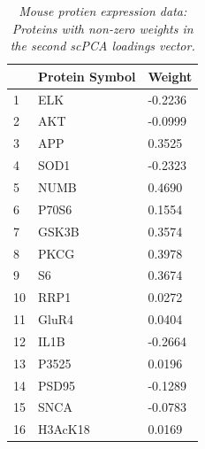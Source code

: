 \documentclass{article}
\begin{document}
\newpage
\begin{longtable}{| l | p{4cm} | l |}
  \caption{{\em Mouse protien expression data: Proteins with non-zero weights in the second scPCA loadings vector.}}
  \label{tab:mouse_prot_2} \\
  \hline
 & Protein Symbol & Weight \\ 
 \hline
  1 & ELK & -0.2236 \\ 
  2 & AKT & -0.0999 \\ 
  3 & APP & 0.3525 \\ 
  4 & SOD1 & -0.2323 \\ 
  5 & NUMB & 0.4690 \\ 
  6 & P70S6 & 0.1554 \\ 
  7 & GSK3B & 0.3574 \\ 
  8 & PKCG & 0.3978 \\ 
  9 & S6 & 0.3674 \\ 
  10 & RRP1 & 0.0272 \\ 
  11 & GluR4 & 0.0404 \\ 
  12 & IL1B & -0.2664 \\ 
  13 & P3525 & 0.0196 \\ 
  14 & PSD95 & -0.1289 \\ 
  15 & SNCA & -0.0783 \\ 
  16 & H3AcK18 & 0.0169 \\ 
 \hline
 \end{longtable}
 
\newpage
{}

 
\end{document}
